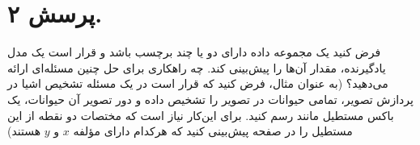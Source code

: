 
\section{پرسش ۲.}
فرض کنید یک مجموعه داده دارای دو یا چند برچسب باشد و قرار است یک مدل یادگیرنده، مقدار آن‌ها را پیش‌بینی کند. چه راهکاری برای حل چنین مسئله‌ای ارائه می‌دهید؟ (به عنوان مثال، فرض کنید که قرار است در یک مسئله تشخیص اشیا در پردازش تصویر، تمامی حیوانات در تصویر را تشخیص داده و دور تصویر آن حیوانات، یک باکس مستطیل مانند رسم کنید. برای این‌کار نیاز است که مختصات دو نقطه از این مستطیل را در صفحه پیش‌بینی کنید که هرکدام دارای مؤلفه $x$ و $y$ هستند)